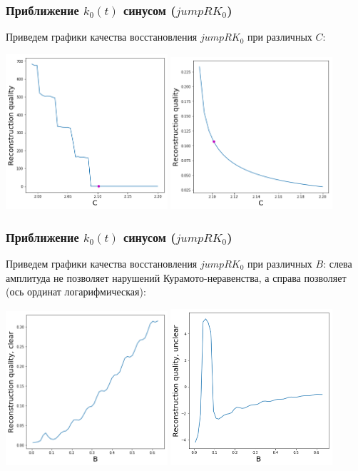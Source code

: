 \documentclass{beamer}
\begin{document}
\begin{frame}
\frametitle{Приближение $k_0(t)$ синусом ($jumpRK_0$)}
Приведем графики качества восстановления $jumpRK_0$ при различных $C$:
\begin{center}
	\includegraphics[width=0.45\textwidth]{sinC1.png} %
	\includegraphics[width=0.45\textwidth]{sinC2.png}
\end{center}
\end{frame}

\begin{frame}
\frametitle{Приближение $k_0(t)$ синусом ($jumpRK_0$)}
Приведем графики качества восстановления $jumpRK_0$ при различных $B$: слева амплитуда не позволяет нарушений Курамото-неравенства, а справа позволяет (ось ординат логарифмическая):
\begin{center}
	\includegraphics[width=0.45\textwidth]{sinB1.png} %
	\includegraphics[width=0.45\textwidth]{sinB2.png}
\end{center}
\end{frame}
\end{document}
